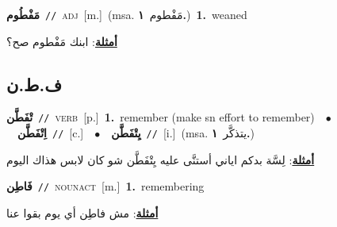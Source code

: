 \documentclass[10pt,a4paper,twoside]{article} %
\begin{document}
\begin{multicols}{2}
{\setlength\topsep{0pt}\textbf{\foreignlanguage{arabic}{مَفْطُوم}}\ {\color{gray}\texttt{//}\color{black}}\ \textsc{adj}\ [m.]\ \color{gray}(msa. \foreignlanguage{arabic}{مَفْطوم}~\foreignlanguage{arabic}{\textbf{١.}})\color{black}\ \textbf{1.}~weaned\  \begin{flushright}\color{gray}\foreignlanguage{arabic}{\textbf{\underline{\foreignlanguage{arabic}{أمثلة}}}: ابنك مَفْطوم صح؟}\end{flushright}\color{black}} \vspace{2mm}

\vspace{-3mm}
\subsection*{\color{blue}\foreignlanguage{arabic}{ف.ط.ن}\color{blue}{}} 

{\setlength\topsep{0pt}\textbf{\foreignlanguage{arabic}{تْفَطَّن}}\ {\color{gray}\texttt{//}\color{black}}\ \textsc{verb}\ [p.]\ \textbf{1.}~remember (make sn effort to remember)\ \ $\bullet$\ \ \setlength\topsep{0pt}\textbf{\foreignlanguage{arabic}{اِتْفَطَّن}}\ {\color{gray}\texttt{//}\color{black}}\ [c.]\ \ $\bullet$\ \ \setlength\topsep{0pt}\textbf{\foreignlanguage{arabic}{يِتْفَطَّن}}\ {\color{gray}\texttt{//}\color{black}}\ [i.]\ \color{gray}(msa. \foreignlanguage{arabic}{يتذكَّر}~\foreignlanguage{arabic}{\textbf{١.}})\color{black}\  \begin{flushright}\color{gray}\foreignlanguage{arabic}{\textbf{\underline{\foreignlanguage{arabic}{أمثلة}}}: لِسَّة بدكم اياني أستنَّى عليه يِتْفَطَّن شو كان لابس هذاك اليوم}\end{flushright}\color{black}} \vspace{2mm}

{\setlength\topsep{0pt}\textbf{\foreignlanguage{arabic}{فَاطِن}}\ {\color{gray}\texttt{//}\color{black}}\ \textsc{noun\textunderscore act}\ [m.]\ \textbf{1.}~remembering\  \begin{flushright}\color{gray}\foreignlanguage{arabic}{\textbf{\underline{\foreignlanguage{arabic}{أمثلة}}}: مش فاطِن أي يوم بقوا عنا}\end{flushright}\color{black}} \vspace{2mm}


\end{multicols}
\end{document}
